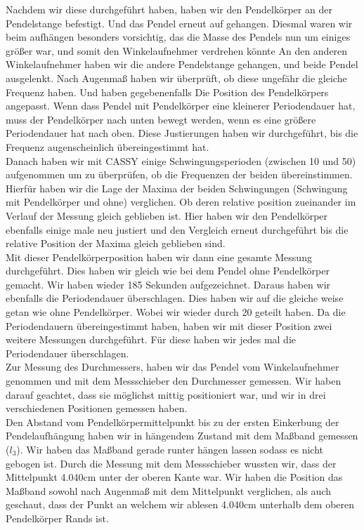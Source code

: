 \documentclass[twoside]{protokoll}
\begin{document}
Nachdem wir diese durchgeführt haben, haben wir den Pendelkörper an der Pendelstange befestigt. 
Und das Pendel erneut auf gehangen. 
Diesmal waren wir beim aufhängen besonders vorsichtig, das die Masse des Pendels nun um einiges größer war, und somit den Winkelaufnehmer verdrehen könnte
An den anderen Winkelaufnehmer haben wir die andere Pendelstange gehangen, und beide Pendel ausgelenkt.
Nach Augenmaß haben wir überprüft, ob diese ungefähr die gleiche Frequenz haben. Und haben gegebenenfalls Die Position des Pendelkörpers angepasst.
Wenn dass Pendel mit Pendelkörper eine kleinerer Periodendauer hat, muss der Pendelkörper nach unten bewegt werden, wenn es eine größere Periodendauer hat nach oben.
Diese Justierungen haben wir durchgeführt, bis die Frequenz augenscheinlich übereingestimmt hat. \\

Danach haben wir mit CASSY einige Schwingungsperioden (zwischen 10 und 50) aufgenommen um zu überprüfen, ob die Frequenzen der beiden übereinstimmen. 
Hierfür haben wir die Lage der Maxima der beiden Schwingungen (Schwingung mit Pendelkörper und ohne) verglichen.
Ob deren relative position zueinander im Verlauf der Messung gleich geblieben ist.
Hier haben wir den Pendelkörper ebenfalls einige male neu justiert und den Vergleich erneut durchgeführt bis die relative Position der Maxima gleich geblieben sind.\\

Mit dieser Pendelkörperposition haben wir dann eine gesamte Messung durchgeführt.
Dies haben wir gleich wie bei dem Pendel ohne Pendelkörper gemacht. Wir haben wieder 185 Sekunden aufgezeichnet. 
Daraus haben wir ebenfalls die Periodendauer überschlagen. 
Dies haben wir auf die gleiche weise getan wie ohne Pendelkörper. Wobei wir wieder durch 20 geteilt haben.
Da die Periodendauern übereingestimmt haben, haben wir mit dieser Position zwei weitere Messungen durchgeführt.
Für diese haben wir jedes mal die Periodendauer überschlagen.\\

Zur Messung des Durchmessers, haben wir das Pendel vom Winkelaufnehmer genommen und mit dem Messschieber den Durchmesser gemessen.
Wir haben darauf geachtet, dass sie möglichst mittig positioniert war, und wir in drei verschiedenen Positionen gemessen haben. \\

Den Abstand vom Pendelkörpermittelpunkt bis zu der ersten Einkerbung der Pendelaufhängung haben wir in hängendem Zustand mit dem Maßband gemessen ($l_3$).
Wir haben das Maßband gerade runter hängen lassen sodass es nicht gebogen ist. 
Durch die Messung mit dem Messschieber wussten wir, dass der Mittelpunkt 4.040cm unter der oberen Kante war.
Wir haben die Position das Maßband sowohl nach Augenmaß mit dem Mittelpunkt verglichen, als auch geschaut, 
dass der Punkt an welchem wir ablesen 4.040cm unterhalb dem oberen Pendelkörper Rands ist.
\end{document}
